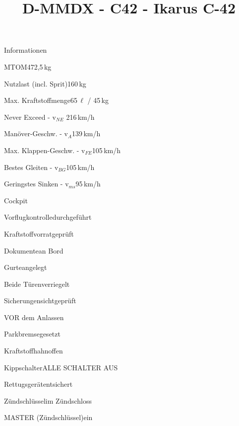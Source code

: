 \def\papersize{4}




\title{D-MMDX  -  C42  -  Ikarus C-42}

\begin{checklist}{Informationen}
 	\item{MTOM}{472,5\,kg}
  	\item{Nutzlast (incl. Sprit)}{160\,kg}
  	\item{Max. Kraftstoffmenge}{65\,${\ell}$ / 45\,kg}
 	  \item{Never Exceed  -  v$_{NE}$ }{216\,km/h}
	  \item{Manöver-Geschw.  -  v$_{A}$}{139\,km/h}
	  \item{Max. Klappen-Geschw.  -  v$_{FE}$}{105\,km/h}
	  \item{Bestes Gleiten  -  v$_{BG}$}{105\,km/h}
	  \item{Geringstes Sinken  -  v$_{ms}$}{95\,km/h}
\end{checklist}

\begin{checklist}{Cockpit}
	\item{Vorflugkontrolle}{durchgeführt}
	\item{Kraftstoffvorrat}{geprüft}
	\item{Dokumente}{an Bord}
	\item{Gurte}{angelegt}
	\item{Beide Türen}{verriegelt}
	\item{Sicherungen}{sichtgeprüft}
\end{checklist}

\begin{checklist}{VOR dem Anlassen}
	\item{Parkbremse}{gesetzt}
	\item{Kraftstoffhahn}{offen}
	\item{Kippschalter}{ALLE SCHALTER AUS}
	\item{Rettugsgerät}{entsichert}
	\item{Zündschlüssel}{im Zündschloss}
	\item{MASTER (Zündschlüssel)}{ein}
\end{checklist}

